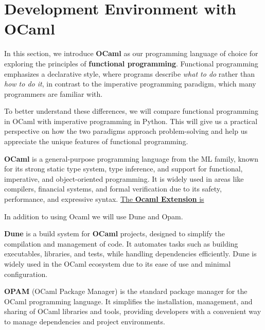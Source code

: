 \section{Development Environment with OCaml}

In this section, we introduce \textbf{OCaml} as our programming language of choice for exploring
the principles of \textbf{functional programming}. Functional programming emphasizes a declarative
style, where programs describe \textit{what to do} rather than \textit{how to do it},
in contrast to the imperative programming paradigm, which many programmers are familiar with.

To better understand these differences, we will compare functional programming in OCaml with
imperative programming in Python. This will give us a practical perspective on how the two
paradigms approach problem-solving and help us appreciate the unique features of functional programming.

\newpage

\begin{Def}[OCaml]

	\textbf{OCaml} is a general-purpose programming language from the ML family,
	known for its strong static type system, type inference, and support for functional,
	imperative, and object-oriented programming. It is widely used in areas like compilers,
	financial systems, and formal verification due to its safety, performance,
	and expressive syntax. \underline{ The \textbf{Ocaml Extension} is }
\end{Def}

\noindent
In addition to using Ocaml we will use Dune and Opam.
\begin{Def}[Dune]

	\textbf{Dune} is a build system for \textbf{OCaml} projects, designed to simplify
	the compilation and management of code. It automates tasks such as building executables,
	libraries, and tests, while handling dependencies efficiently. Dune is widely used in the
	OCaml ecosystem due to its ease of use and minimal configuration.

\end{Def}

\begin{Def}[OPAM]

	\textbf{OPAM} (OCaml Package Manager) is the standard package manager for the OCaml programming
	language. It simplifies the installation, management, and sharing of OCaml libraries and tools,
	providing developers with a convenient way to manage dependencies and project environments.
\end{Def}

